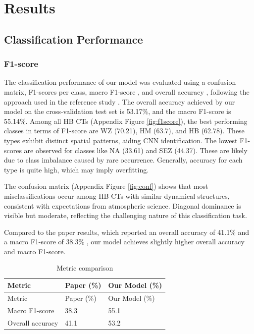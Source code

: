 \documentclass[
]{krantz}
\begin{document}
\section{Results}\label{results}

\subsection{Classification Performance}\label{classification-performance}

\subsubsection{F1-score}\label{f1-score}

The classification performance of our model was evaluated using a confusion matrix, F1-scores per class,
macro F1-score \citep{Opitz2019}, and overall accuracy \citep{Alberg2004}, following the approach used in the reference study \citep{Mittermeier2022}.
The overall accuracy achieved by our model on the cross-validation test set is 53.17\%, and the macro F1-score is 55.14\%.
Among all HB CTs (Appendix Figure \ref{fig:f1score}), the best performing classes in terms of F1-score are WZ (70.21), HM (63.7), and HB (62.78).
These types exhibit distinct spatial patterns, aiding CNN identification.
The lowest F1-scores are observed for classes like NA (33.61) and SEZ (44.37).
These are likely due to class imbalance caused by rare occurrence.
Generally, accuracy for each type is quite high, which may imply overfitting.

The confusion matrix (Appendix Figure \ref{fig:conf}) shows that most misclassifications occur among HB CTs with similar dynamical structures, consistent with expectations from atmospheric science. Diagonal dominance is visible but moderate, reflecting the challenging nature of this classification task.

Compared to the paper results, which reported an overall accuracy of 41.1\% and a macro F1-score of 38.3\% \citep{Mittermeier2022},
our model achieves slightly higher overall accuracy and macro F1-score.

\begin{longtable}[]{@{}lll@{}}
\caption{Metric comparison}\tabularnewline
\toprule\noalign{}
Metric & Paper (\%) & Our Model (\%) \\
\midrule\noalign{}
\endfirsthead
\toprule\noalign{}
Metric & Paper (\%) & Our Model (\%) \\
\midrule\noalign{}
\endhead
\bottomrule\noalign{}
\endlastfoot
Macro F1-score & 38.3 & 55.1 \\
Overall accuracy & 41.1 & 53.2 \\
\end{longtable}
\end{document}
